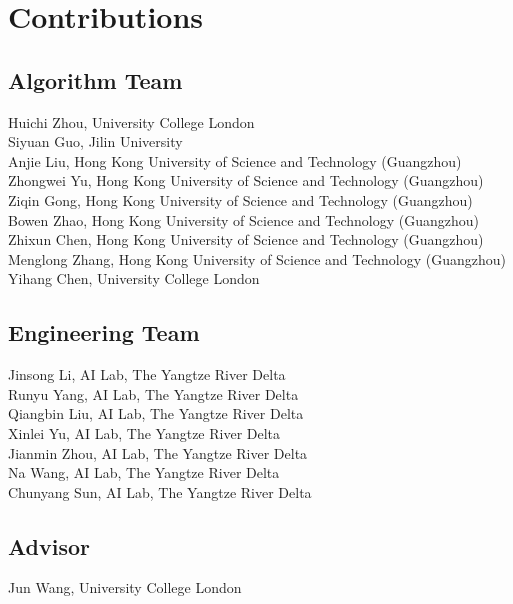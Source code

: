 \documentclass[11pt,a4paper]{article}
\begin{document}
\section*{Contributions}

\subsection*{Algorithm Team}

Huichi Zhou, University College London \\
Siyuan Guo, Jilin University \\
Anjie Liu, Hong Kong University of Science and Technology (Guangzhou)  \\
Zhongwei Yu, Hong Kong University of Science and Technology (Guangzhou)  \\
Ziqin Gong, Hong Kong University of Science and Technology (Guangzhou)  \\
Bowen Zhao, Hong Kong University of Science and Technology (Guangzhou)  \\
Zhixun Chen, Hong Kong University of Science and Technology (Guangzhou)  \\
Menglong Zhang, Hong Kong University of Science and Technology (Guangzhou)  \\
Yihang Chen, University College London



\subsection*{Engineering Team}

Jinsong Li, AI Lab, The Yangtze River Delta \\
Runyu Yang, AI Lab, The Yangtze River Delta \\
Qiangbin Liu, AI Lab, The Yangtze River Delta \\
Xinlei Yu, AI Lab, The Yangtze River Delta \\
Jianmin Zhou, AI Lab, The Yangtze River Delta \\
Na Wang, AI Lab, The Yangtze River Delta \\
Chunyang Sun, AI Lab, The Yangtze River Delta 

\subsection*{Advisor}

Jun Wang, University College London


\end{document}
